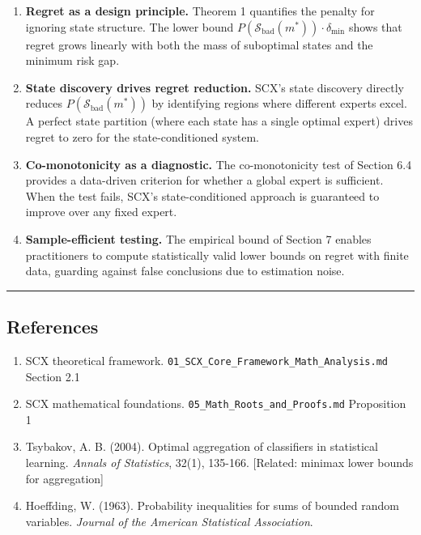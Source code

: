 \documentclass[
  12pt,
]{article}
\providecommand{\tightlist}{%
  \setlength{\itemsep}{0pt}\setlength{\parskip}{0pt}}
\begin{document}
\begin{enumerate}
\def\labelenumi{\arabic{enumi}.}
\item
  \textbf{Regret as a design principle.} Theorem 1 quantifies the
  penalty for ignoring state structure. The lower bound
  \(P(\mathcal{S}_{\text{bad}}(m^*)) \cdot \delta_{\min}\) shows that
  regret grows linearly with both the mass of suboptimal states and the
  minimum risk gap.
\item
  \textbf{State discovery drives regret reduction.} SCX's state
  discovery directly reduces \(P(\mathcal{S}_{\text{bad}}(m^*))\) by
  identifying regions where different experts excel. A perfect state
  partition (where each state has a single optimal expert) drives regret
  to zero for the state-conditioned system.
\item
  \textbf{Co-monotonicity as a diagnostic.} The co-monotonicity test of
  Section 6.4 provides a data-driven criterion for whether a global
  expert is sufficient. When the test fails, SCX's state-conditioned
  approach is guaranteed to improve over any fixed expert.
\item
  \textbf{Sample-efficient testing.} The empirical bound of Section 7
  enables practitioners to compute statistically valid lower bounds on
  regret with finite data, guarding against false conclusions due to
  estimation noise.
\end{enumerate}

\begin{center}\rule{0.5\linewidth}{0.5pt}\end{center}

\subsection{References}\label{references}

\begin{enumerate}
\def\labelenumi{\arabic{enumi}.}
\tightlist
\item
  SCX theoretical framework. \texttt{01\_SCX\_Core\_Framework\_Math\_Analysis.md}
  Section 2.1
\item
  SCX mathematical foundations. \texttt{05\_Math\_Roots\_and\_Proofs.md}
  Proposition 1
\item
  Tsybakov, A. B. (2004). Optimal aggregation of classifiers in
  statistical learning. \emph{Annals of Statistics}, 32(1), 135-166.
  {[}Related: minimax lower bounds for aggregation{]}
\item
  Hoeffding, W. (1963). Probability inequalities for sums of bounded
  random variables. \emph{Journal of the American Statistical
  Association}.
\end{enumerate}
\end{document}
